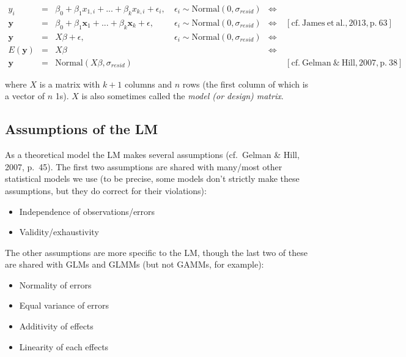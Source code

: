 \documentclass[
]{article}
\providecommand{\tightlist}{%
  \setlength{\itemsep}{0pt}\setlength{\parskip}{0pt}}
\begin{document}
\begin{align}
y_i & = & \beta_0+\beta_1x_{1,i}+...+\beta_kx_{k,i} + \epsilon_i, & \ \epsilon_i \sim \mathrm{Normal}(0, \sigma_{resid}) & \Leftrightarrow \\
{\mathbf y} & = &  \beta_0+\beta_1{\mathbf x_1}+...+\beta_k{\mathbf x_k} + \epsilon, & \ \epsilon_i \sim \mathrm{Normal}(0, \sigma_{resid})  & \Leftrightarrow & \ \mathrm{[cf.\ James\ et\ al., 2013, p.\ 63]}\\
{\mathbf y} & = & X\beta + \epsilon, & \ \epsilon_i \sim \mathrm{Normal}(0, \sigma_{resid})  & \Leftrightarrow & \\
E({\mathbf y}) & = & X\beta &  & \Leftrightarrow & \\
\mathbf{y} & = & \mathrm{Normal}(X\beta, \sigma_{resid})&  &  & \ \mathrm{[cf.\ Gelman\ \&\ Hill, 2007, p.\ 38]}
\end{align}

where \(X\) is a matrix with \(k + 1\) columns and \(n\) rows (the first
column of which is a vector of \(n\) 1s). \(X\) is also sometimes called
the \emph{model (or design) matrix}.

\hypertarget{assumptions-of-the-lm}{%
\subsection{Assumptions of the LM}\label{assumptions-of-the-lm}}

As a theoretical model the LM makes several assumptions (cf.~Gelman \&
Hill, 2007, p.~45). The first two assumptions are shared with many/most
other statistical models we use (to be precise, some models don't
strictly make these assumptions, but they do correct for their
violations):

\begin{itemize}
\tightlist
\item
  Independence of observations/errors
\item
  Validity/exhaustivity
\end{itemize}

The other assumptions are more specific to the LM, though the last two
of these are shared with GLMs and GLMMs (but not GAMMs, for example):

\begin{itemize}
\tightlist
\item
  Normality of errors
\item
  Equal variance of errors
\item
  Additivity of effects
\item
  Linearity of each effects
\end{itemize}
\end{document}
